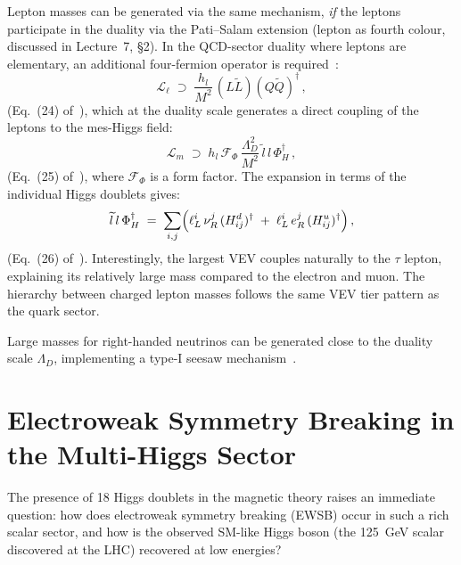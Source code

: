 \documentclass[11pt,a4paper]{article}
\begin{document}
Lepton masses can be generated via the same mechanism, \emph{if} the
leptons participate in the duality via the Pati--Salam extension
(lepton as fourth colour, discussed in Lecture~7, \S2).  In the QCD-sector duality where leptons are
elementary, an additional four-fermion operator is
required~\cite{CacciapagliaSannino2024}:
\begin{equation}\label{eq:lepton-operator}
  \mathcal{L}_\ell
  \;\supset\;
  \frac{h_l}{M^2}\, (L\widetilde{L})(Q\widetilde{Q})^\dagger\,,
\end{equation}
(Eq.~(24) of~\cite{CacciapagliaSannino2024}),
which at the duality scale generates a direct coupling of the leptons
to the mes-Higgs field:
\begin{equation}\label{eq:lepton-yukawa}
  \mathcal{L}_m
  \;\supset\;
  h_l\, \mathcal{F}_\Phi\,
  \frac{\Lambda_D^2}{M^2}\,
  \widetilde{l}\, l\, \Phi_H^\dagger\,,
\end{equation}
(Eq.~(25) of~\cite{CacciapagliaSannino2024}),
where $\mathcal{F}_\Phi$ is a form factor.  The expansion in
terms of the individual Higgs doublets gives:
\begin{equation}\label{eq:lepton-yukawa-expanded}
  \widetilde{l}\, l\, \Phi_H^\dagger
  \;=\; \sum_{i,j}
  \Bigl(
    \ell_L^i\, \nu_R^j\, (H_{ij}^d)^\dagger
    \;+\; \ell_L^i\, e_R^j\, (H_{ij}^u)^\dagger
  \Bigr)\,,
\end{equation}
(Eq.~(26) of~\cite{CacciapagliaSannino2024}).
Interestingly, the largest VEV couples naturally to the $\tau$ lepton,
explaining its relatively large mass compared to the electron and muon.
The hierarchy between charged lepton masses follows the same VEV tier
pattern as the quark sector.

Large masses for right-handed neutrinos can be generated close to the
duality scale $\Lambda_D$, implementing a type-I seesaw
mechanism~\cite{CacciapagliaSannino2024}.


\section{Electroweak Symmetry Breaking in the Multi-Higgs Sector}
\label{sec:ewsb}

The presence of 18 Higgs doublets in the magnetic theory raises an
immediate question: how does electroweak symmetry breaking (EWSB) occur
in such a rich scalar sector, and how is the observed SM-like Higgs
boson (the 125~GeV scalar discovered at the LHC) recovered at low
energies?
\end{document}
